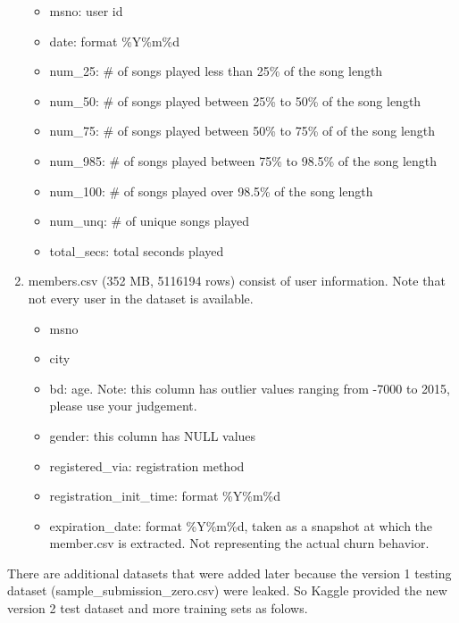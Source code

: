 \documentclass[11pt]{article}
\begin{document}
\begin{enumerate}
  \begin{itemize}
  \itemsep1pt\parskip0pt
  \item
    msno: user id
  \item
    date: format \%Y\%m\%d
  \item
    num\_25: \# of songs played less than 25\% of the song length
  \item
    num\_50: \# of songs played between 25\% to 50\% of the song length
  \item
    num\_75: \# of songs played between 50\% to 75\% of of the song
    length
  \item
    num\_985: \# of songs played between 75\% to 98.5\% of the song
    length
  \item
    num\_100: \# of songs played over 98.5\% of the song length
  \item
    num\_unq: \# of unique songs played
  \item
    total\_secs: total seconds played
  \end{itemize}
\item
  members.csv (352 MB, 5116194 rows) consist of user information. Note
  that not every user in the dataset is available.

  \begin{itemize}
  \itemsep1pt\parskip0pt
  \item
    msno
  \item
    city
  \item
    bd: age. Note: this column has outlier values ranging from -7000 to
    2015, please use your judgement.
  \item
    gender: this column has NULL values
  \item
    registered\_via: registration method
  \item
    registration\_init\_time: format \%Y\%m\%d
  \item
    expiration\_date: format \%Y\%m\%d, taken as a snapshot at which the
    member.csv is extracted. Not representing the actual churn behavior.
  \end{itemize}
\end{enumerate}

There are additional datasets that were added later because the version
1 testing dataset (sample\_submission\_zero.csv) were leaked. So Kaggle
provided the new version 2 test dataset and more training sets as
folows.
\end{document}
